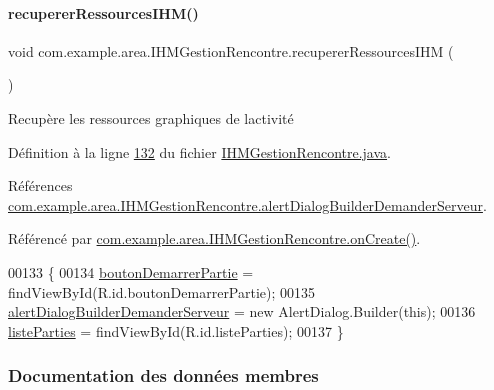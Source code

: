 \paragraph{\texorpdfstring{recuperer\+Ressources\+I\+H\+M()}{recupererRessourcesIHM()}}
{\footnotesize\ttfamily void com.\+example.\+area.\+I\+H\+M\+Gestion\+Rencontre.\+recuperer\+Ressources\+I\+HM (\begin{DoxyParamCaption}{ }\end{DoxyParamCaption})\hspace{0.3cm}{\ttfamily [private]}}



Recupère les ressources graphiques de l\textquotesingle{}activité 



Définition à la ligne \hyperlink{_i_h_m_gestion_rencontre_8java_source_l00132}{132} du fichier \hyperlink{_i_h_m_gestion_rencontre_8java_source}{I\+H\+M\+Gestion\+Rencontre.\+java}.



Références \hyperlink{_i_h_m_gestion_rencontre_8java_source_l00051}{com.\+example.\+area.\+I\+H\+M\+Gestion\+Rencontre.\+alert\+Dialog\+Builder\+Demander\+Serveur}.



Référencé par \hyperlink{_i_h_m_gestion_rencontre_8java_source_l00064}{com.\+example.\+area.\+I\+H\+M\+Gestion\+Rencontre.\+on\+Create()}.


\begin{DoxyCode}
00133     \{
00134         \hyperlink{classcom_1_1example_1_1area_1_1_i_h_m_gestion_rencontre_a29f52b3b1397d21728bbe60b826facd8}{boutonDemarrerPartie} = findViewById(R.id.boutonDemarrerPartie);
00135         \hyperlink{classcom_1_1example_1_1area_1_1_i_h_m_gestion_rencontre_a47ed7018b2af1ac9197715b9008a34a5}{alertDialogBuilderDemanderServeur} = \textcolor{keyword}{new} AlertDialog.Builder(\textcolor{keyword}{this});
00136         \hyperlink{classcom_1_1example_1_1area_1_1_i_h_m_gestion_rencontre_a127e07e7de6ff7e02fa84c52a3399aaa}{listeParties} = findViewById(R.id.listeParties);
00137     \}
\end{DoxyCode}


\subsubsection{Documentation des données membres}
\mbox{\label{classcom_1_1example_1_1area_1_1_i_h_m_gestion_rencontre_a47ed7018b2af1ac9197715b9008a34a5}} 
